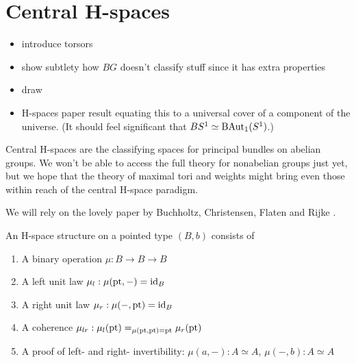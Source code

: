 \section{Central H-spaces}

\begin{itemize}
\item introduce torsors
\item show subtlety how \( BG \) doesn't classify stuff since it has extra properties
\item draw 
\item H-spaces paper result equating this to a universal cover of a component of the universe. (It should feel significant that \( BS^1\simeq \mathrm{BAut}_1(S^1) \).)
\end{itemize}

Central H-spaces are the classifying spaces for principal bundles on abelian groups. We won't be able to access the full theory for nonabelian groups just yet, but we hope that the theory of maximal tori and weights might bring even those within reach of the central H-space paradigm.

We will rely on the lovely paper by Buchholtz, Christensen, Flaten and Rijke \cite{buchholtz2023central}. 

\begin{mydef}
An H-space structure on a pointed type \( (B,b) \) consists of
\begin{enumerate}
\item A binary operation \( \mu:B\to B\to B \)
\item A left unit law \( \mu_l:\mu(\mathrm{pt},-)=\text{id}_B \)
\item A right unit law \( \mu_r:\mu(-,\mathrm{pt})=\text{id}_B \)
\item A coherence \( \mu_{lr}:\mu_l(\mathrm{pt})=_{\mu(\mathrm{pt},\mathrm{pt})=\mathrm{pt}}\mu_r(\mathrm{pt}) \)
\item A proof of left- and right- invertibility: \( \mu(a,-):A\simeq A \), \( \mu(-, b):A\simeq A \)
\end{enumerate}
\end{mydef}

